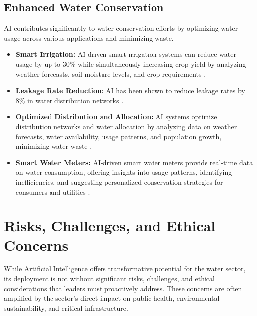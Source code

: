 \subsection{Enhanced Water Conservation}
AI contributes significantly to water conservation efforts by optimizing water usage across various applications and minimizing waste.
\begin{itemize}
    \item \textbf{Smart Irrigation:} AI-driven smart irrigation systems can reduce water usage by up to 30\% while simultaneously increasing crop yield by analyzing weather forecasts, soil moisture levels, and crop requirements \cite{SustainabilityLinkedIn_Benefits}.
    \item \textbf{Leakage Rate Reduction:} AI has been shown to reduce leakage rates by 8\% in water distribution networks \cite{MDPI_Benefits}.
    \item \textbf{Optimized Distribution and Allocation:} AI systems optimize distribution networks and water allocation by analyzing data on weather forecasts, water availability, usage patterns, and population growth, minimizing water waste \cite{WhiteCase_Benefits}. 
    \item \textbf{Smart Water Meters:} AI-driven smart water meters provide real-time data on water consumption, offering insights into usage patterns, identifying inefficiencies, and suggesting personalized conservation strategies for consumers and utilities \cite{WaterIndustryJournal_Benefits}.
\end{itemize}

\section{Risks, Challenges, and Ethical Concerns}

While Artificial Intelligence offers transformative potential for the water sector, its deployment is not without significant risks, challenges, and ethical considerations that leaders must proactively address. These concerns are often amplified by the sector's direct impact on public health, environmental sustainability, and critical infrastructure.

